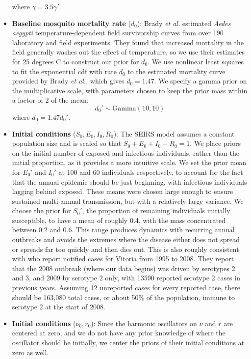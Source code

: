 \documentclass[12pt,letterpaper]{article}
\begin{document}
\begin{itemize}
where $\gamma = 3.5\gamma'$.
\\
\item \textbf{Baseline mosquito mortality rate} ($d_0$): Brady \textit{et al.} \cite{Brady2013} estimated \textit{Aedes aegypti} temperature-dependent field survivorship curves from over 190 laboratory and field experiments.
They found that increased mortality in the field generally washes out the effect of temperature, so we use their estimates for 25 degrees C to construct our prior for $d_0$.  
We use nonlinear least squares to fit the exponential cdf with rate $d_0$ to the estimated mortality curve provided by Brady \textit{et al.}, which gives $d_0 = 1.47$.
We specify a gamma prior on the multiplicative scale, with parameters chosen to keep the prior mass within a factor of 2 of the mean:
\begin{equation}
d_0' \sim \text{Gamma}(10, 10)
\end{equation}
where $d_0 = 1.47d_0'$.
\\
\item \textbf{Initial conditions} ($S_0, E_0, I_0, R_0$): The SEIRS model assumes a constant population size and is scaled so that $S_0+E_0+I_0+R_0 = 1$.
We place priors on the initial number of exposed and infectious individuals, rather than the initial proportion, as it provides a more intuitive scale.
We set the prior mean for $E_0'$ and $I_0'$ at 100 and 60 individuals respectively, to account for the fact that the annual epidemic should be just beginning, with infectious individuals lagging behind exposed.
These means were chosen large enough to ensure sustained multi-annual transmission, but with a relatively large variance.
We choose the prior for $S_0'$, the proportion of remaining individuals initially susceptible, to have a mean of roughly  0.4, with the mass concentrated between 0.2 and 0.6.
This range produces dynamics with recurring annual outbreaks and avoids the extremes where the disease either does not spread or spreads far too quickly and then dies out.
This is also roughly consistent with \cite{Cardoso2011a} who report notified cases for Vitoria from 1995 to 2008. 
They report that the 2008 outbreak (where our data begins) was driven by serotypes 2 and 3, and 2009 by serotype 2 only, with 13590 reported serotype 2 cases in previous years.
Assuming 12 unreported cases for every reported case, there should be 163,080 total cases, or about 50\% of the population, immune to serotype 2 at the start of 2008.
\\
\item \textbf{Initial conditions} ($\nu_0, r_0$): Since the harmonic oscillators on $\nu$ and $r$ are centered at zero, and we do not have any prior knowledge of where the oscillator should be initially, we center the priors of their initial conditions at zero as well.  

\end{itemize}
\end{document}
